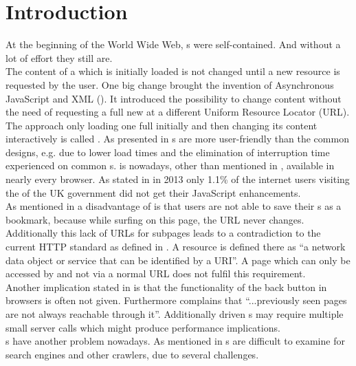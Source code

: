 \section{Introduction\label{chap:introduction}}
At the beginning of the World Wide Web, \webPage{}s were self-contained. 
And without a lot of effort they still are. 
\\
The content of a \webPage{} which is initially loaded is not changed until a new resource is requested by the user.
One big change brought the invention of Asynchronous JavaScript and XML (\ajax{}).
It introduced the possibility to change content without the need of requesting a full new \webPage{} at a different Uniform Resource Locator (URL).
The approach only loading one full \webPage{} initially and then changing its content interactively is called \singlePageApplication{}.
As presented in \cite{jonsson2009database} \singlePageApplication{}s are more user-friendly than the common designs, e.g. due to lower load times and the elimination of interruption time experienced on common \webApplication{}s.
\ajax{} is nowadays, other than mentioned in \cite{jonsson2009database}, available in nearly every browser.
As stated in \cite{herlihy2013howmany} in 2013 only 1.1\% of the internet users visiting the \webSite{} of the UK government did not get their JavaScript enhancements.
\\
As mentioned in \cite{jonsson2009database} a disadvantage of \ajax{} is that users are not able to save their \webSite{}s as a bookmark, because while surfing on this page, the URL never changes.
Additionally this lack of URLs for subpages leads to a contradiction to the current HTTP standard as defined in \cite{fielding1999hypertext}.
A resource is defined there as \enquote{a network data object or service that can be identified by a URI}.
A page which can only be accessed by \ajax{} and not via a normal URL does not fulfil this requirement.
\\
Another implication stated in \cite{jonsson2009database} is that the functionality of the back button in browsers is often not given.
Furthermore \cite{estrada2011take} complains that \enquote{...previously seen pages are not always reachable through it}.
Additionally \ajax{} driven \webApplication{}s may require multiple small server calls which might produce performance implications.
\\
\SinglePageApplication{}s have another problem nowadays. 
As mentioned in \cite{matter2008ajax} \ajax{} \webSite{}s are difficult to examine for search engines and other crawlers, due to several challenges.
